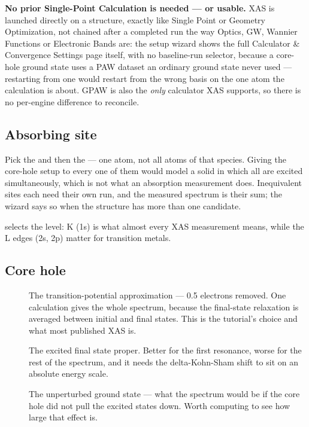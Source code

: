 \begin{calnote}
\textbf{No prior Single-Point Calculation is needed --- or usable.} XAS is
launched directly on a structure, exactly like Single Point or Geometry
Optimization, not chained after a completed run the way Optics, GW, Wannier
Functions or Electronic Bands are: the setup wizard shows the full
Calculator \& Convergence Settings page itself, with no baseline-run
selector, because a core-hole ground state uses a PAW dataset an ordinary
ground state never used --- restarting from one would restart from the
wrong basis on the one atom the calculation is about. GPAW is also the
\emph{only} calculator XAS supports, so there is no per-engine difference
to reconcile.
\end{calnote}

\subsection{Absorbing site}

Pick the  and then the  --- one atom, not all
atoms of that species. Giving the core-hole setup to every one of them would
model a solid in which all are excited simultaneously, which is not what an
absorption measurement does. Inequivalent sites each need their own run, and
the measured spectrum is their sum; the wizard says so when the structure has
more than one candidate.

 selects the level: K (1s) is what almost every XAS measurement means,
while the L edges (2s, 2p) matter for transition metals.

\subsection{Core hole}

\begin{description}
  \item[] The transition-potential approximation --- 0.5
    electrons removed. One calculation gives the whole spectrum, because the
    final-state relaxation is averaged between initial and final states. This
    is the tutorial's choice and what most published XAS is.
  \item[] The excited final state proper. Better for the first
    resonance, worse for the rest of the spectrum, and it needs the
    delta-Kohn-Sham shift to sit on an absolute energy scale.
  \item[] The unperturbed ground state --- what the spectrum would
    be if the core hole did not pull the excited states down. Worth computing
    to see how large that effect is.
\end{description}

